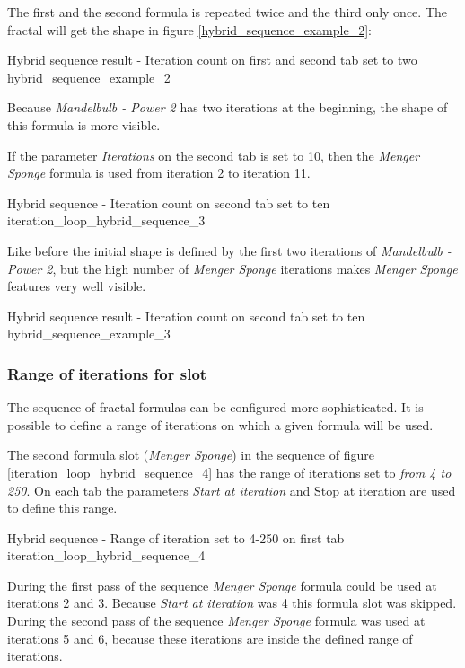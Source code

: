 The first and the second formula is repeated twice and the third only once.
The fractal will get the shape in figure \ref{hybrid_sequence_example_2}:

{Hybrid sequence result - Iteration count on first and second tab set to two}
{hybrid_sequence_example_2}

Because \emph{Mandelbulb - Power 2} has two iterations at the beginning, the shape of this formula is more visible.

If the parameter \emph{Iterations} on the second tab is set to 10,
then the \emph{Menger Sponge} formula is used from iteration 2 to iteration 11.

{Hybrid sequence - Iteration count on second tab set to ten}
{iteration_loop_hybrid_sequence_3}

Like before the initial shape is defined by the first two iterations of \emph{Mandelbulb - Power 2},
but the high number of \emph{Menger Sponge} iterations makes \emph{Menger Sponge} features very well visible.

{Hybrid sequence result - Iteration count on second tab set to ten}
{hybrid_sequence_example_3}

\subsubsection{Range of iterations for slot}

The sequence of fractal formulas can be configured more sophisticated.
It is possible to define a range of iterations on which a given formula will be used.

The second formula slot (\emph{Menger Sponge}) in the sequence of figure \ref{iteration_loop_hybrid_sequence_4} has the range of iterations set to \emph{from 4 to 250}.
On each tab the parameters \emph{Start at iteration} and {Stop at iteration} are used to define this range.

{Hybrid sequence - Range of iteration set to 4-250 on first tab}
{iteration_loop_hybrid_sequence_4}

During the first pass of the sequence \emph{Menger Sponge} formula could be used at iterations 2 and 3.
Because \emph{Start at iteration} was 4 this formula slot was skipped.
During the second pass of the sequence \emph{Menger Sponge} formula was used at iterations 5 and 6,
because these iterations are inside the defined range of iterations.

